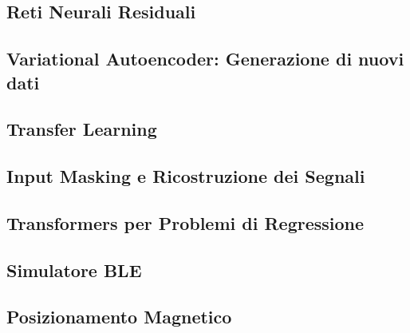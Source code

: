 \documentclass[12pt]{report}
\begin{document}
\subsection{Reti Neurali Residuali}
\subsection{Variational Autoencoder: Generazione di nuovi dati}
\subsection{Transfer Learning}
\subsection{Input Masking e Ricostruzione dei Segnali}
\subsection{Transformers per Problemi di Regressione}
\subsection{Simulatore BLE}
\subsection{Posizionamento Magnetico}

\appendix



\end{document}
